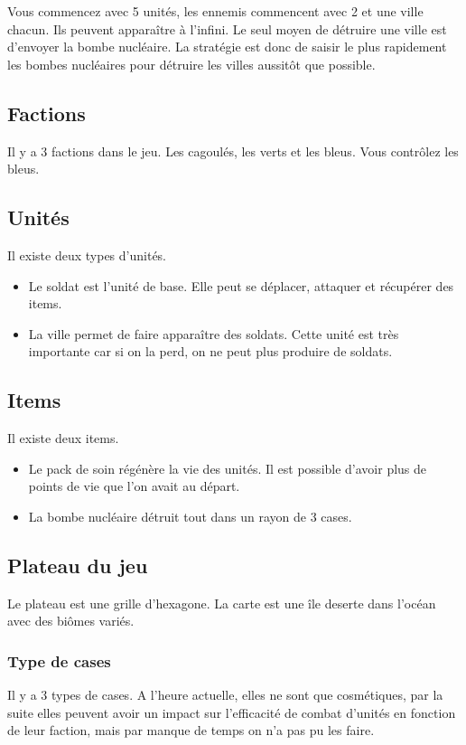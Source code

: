 \documentclass{article}
\begin{document}
Vous commencez avec 5 unités, les ennemis commencent avec 2 et une ville chacun. Ils peuvent apparaître à l'infini. 
Le seul moyen de détruire une ville est d'envoyer la bombe nucléaire. La stratégie est donc de saisir le plus rapidement les bombes nucléaires pour
détruire les villes aussitôt que possible.

\subsection{Factions}
Il y a 3 factions dans le jeu. Les cagoulés, les verts et les bleus. Vous contrôlez les bleus.

\subsection{Unités}
Il existe deux types d'unités.

\begin{itemize}
    \item Le soldat est l'unité de base. Elle peut se déplacer, attaquer et récupérer des items.
    \item La ville permet de faire apparaître des soldats. Cette unité est très importante car si on la perd, on ne peut plus produire de soldats.
\end{itemize}

\subsection{Items}
Il existe deux items.

\begin{itemize}
    \item Le pack de soin régénère la vie des unités. Il est possible d'avoir plus de points de vie que l'on avait au départ.
    \item La bombe nucléaire détruit tout dans un rayon de 3 cases.
\end{itemize}

\subsection{Plateau du jeu}
Le plateau est une grille d'hexagone. La carte est une île deserte dans l'océan avec des biômes variés.

\subsubsection{Type de cases}
Il y a 3 types de cases. A l'heure actuelle, elles ne sont que cosmétiques,
par la suite elles peuvent avoir un impact sur l'efficacité de combat d'unités
en fonction de leur faction, mais par manque de temps on n'a pas pu les faire.
\end{document}
